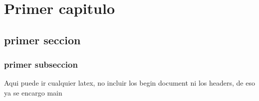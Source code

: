 \chapter{Primer capitulo}
\section{primer seccion}
\subsection{primer subseccion}
Aqui puede ir cualquier latex, no incluir los begin document ni los headers, de eso ya se encargo main
